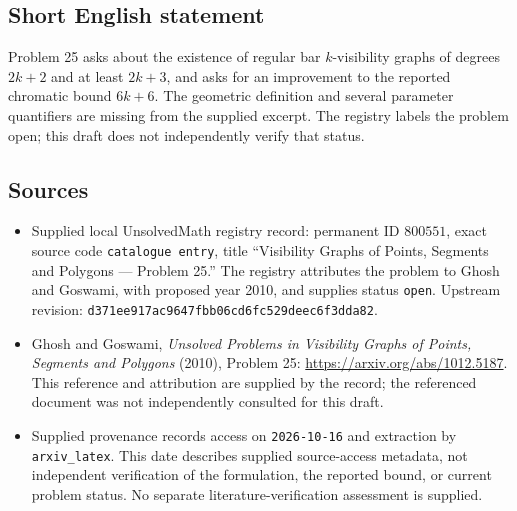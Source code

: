 \documentclass[11pt]{article}
\begin{document}
\subsection{Short English statement}
Problem 25 asks about the existence of regular bar \(k\)-visibility graphs of degrees \(2k+2\) and at least \(2k+3\), and asks for an improvement to the reported chromatic bound \(6k+6\). The geometric definition and several parameter quantifiers are missing from the supplied excerpt. The registry labels the problem open; this draft does not independently verify that status.
\subsection{Sources}
\begin{itemize}
\item Supplied local UnsolvedMath registry record: permanent ID \(800551\), exact source code \texttt{catalogue entry}, title ``Visibility Graphs of Points, Segments and Polygons --- Problem 25.'' The registry attributes the problem to Ghosh and Goswami, with proposed year 2010, and supplies status \texttt{open}. Upstream revision: \texttt{d371ee917ac9647fbb06cd6fc529deec6f3dda82}.
\item Ghosh and Goswami, \emph{Unsolved Problems in Visibility Graphs of Points, Segments and Polygons} (2010), Problem 25: \url{https://arxiv.org/abs/1012.5187}. This reference and attribution are supplied by the record; the referenced document was not independently consulted for this draft.
\item Supplied provenance records access on \texttt{2026-10-16} and extraction by \texttt{arxiv\_latex}. This date describes supplied source-access metadata, not independent verification of the formulation, the reported bound, or current problem status. No separate literature-verification assessment is supplied.
\end{itemize}
\end{document}
